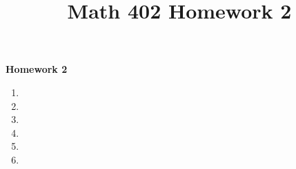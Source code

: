 \documentclass[oneside]{memoir}
\title{Math 402 Homework 2}
\begin{document}
\begin{center}
	\textbf{\large Homework 2} \\
\end{center}

\begin{enumerate}
	\item 
	\item 
	\item 
	\item 
	\item 
	\item 
\end{enumerate}
\end{document}
